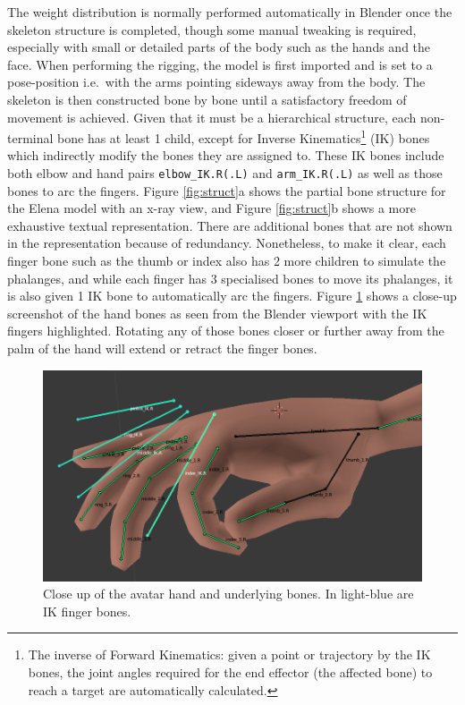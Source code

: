 \documentclass[12pt]{ociamthesis}  %
\begin{document}
The weight distribution is normally performed automatically in Blender once the skeleton structure is completed, though some manual tweaking is required, especially with small or detailed parts of the body such as the hands and the face. When performing the rigging, the model is first imported and is set to a pose-position i.e.\ with the arms pointing sideways away from the body. The skeleton is then constructed bone by bone until a satisfactory freedom of movement is achieved. Given that it must be a hierarchical structure, each non-terminal bone has at least 1 child, except for Inverse Kinematics\footnote{The inverse of Forward Kinematics: given a point or trajectory by the IK bones, the joint angles required for the end effector (the affected bone) to reach a target are automatically calculated.} (IK) bones which indirectly modify the bones they are assigned to. These IK bones include both elbow and hand pairs \texttt{elbow\_IK.R(.L)} and \texttt{arm\_IK.R(.L)} as well as those bones to arc the fingers. Figure \ref{fig:struct}a shows the partial bone structure for the Elena model with an  x-ray view, and Figure \ref{fig:struct}b shows a more exhaustive textual representation. There are additional bones that are not shown in the representation because of redundancy. Nonetheless, to make it clear, each finger bone such as the thumb or index also has 2 more children to simulate the phalanges, and while each finger has 3 specialised bones to move its phalanges, it is also given 1 IK bone to automatically arc the fingers. Figure \ref{fig:hand} shows a close-up screenshot of the hand bones as seen from the Blender viewport with the IK fingers highlighted. Rotating any of those bones closer or further away from the palm of the hand will extend or retract the finger bones.
\begin{figure}[H]
	\centering
    \includegraphics[scale=0.4]{chapter4/hand-zoom}
    \caption[Close up of the avatar hand and underlying bones]{Close up of the avatar hand and underlying bones. In light-blue are IK finger bones.}
    \label{fig:hand}
\end{figure}	
\end{document}
